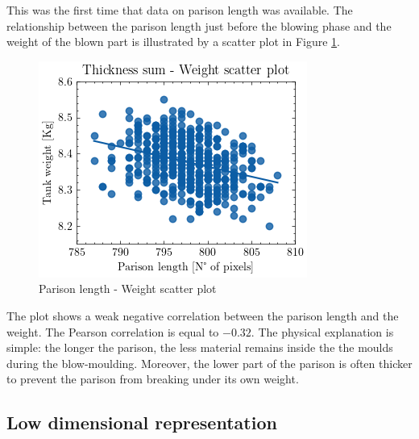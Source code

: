 This was the first time that data on parison length was available. The relationship between the parison length just before the blowing phase and the weight of the blown part is illustrated by a scatter plot in Figure \ref{fig:length_weight_scatter}.
%
\begin{figure}
\centerline{\includegraphics[scale=1.2]{images/chapter_3/length_weight_scatter.png}}
\caption{Parison length - Weight scatter plot}
\label{fig:length_weight_scatter}
\end{figure}
%
The plot shows a weak  negative correlation between the parison length and the weight. The Pearson correlation is equal to $-0.32$. The physical explanation is simple: the longer the parison, the less material remains inside the the moulds during the blow-moulding. Moreover, the lower part of the parison is often thicker to prevent the parison from breaking under its own weight.  

\subsection{Low dimensional representation} \label{Principal Component Analysis for data exploration}

